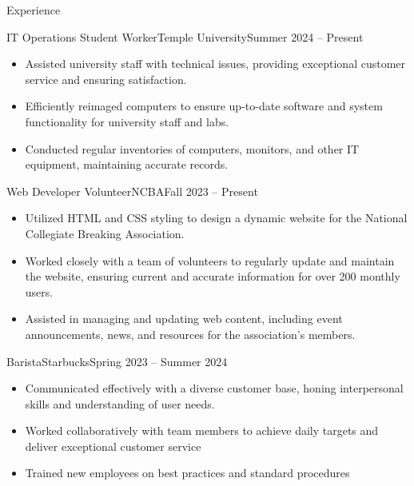 \documentclass[]{mcdowellcv}
\begin{document}
	\begin{cvsection}{Experience}
		\begin{cvsubsection}{IT Operations Student Worker}{Temple University}{Summer 2024 -- Present}			
			\begin{itemize}
				\item Assisted university staff with technical issues, providing exceptional customer service and ensuring satisfaction.
				\item Efficiently reimaged computers to ensure up-to-date software and system functionality for university staff and labs.
				\item Conducted regular inventories of computers, monitors, and other IT equipment, maintaining accurate records.
			\end{itemize}
		\end{cvsubsection}
		
		\begin{cvsubsection}{Web Developer Volunteer}{NCBA}{Fall 2023 -- Present}	
			\begin{itemize}
				\item Utilized HTML and CSS styling to design a dynamic website for the National Collegiate Breaking Association.
				\item Worked closely with a team of volunteers to regularly update and maintain the website, ensuring current and accurate information for over 200 monthly users.
				\item Assisted in managing and updating web content, including event announcements, news, and resources for the association's members.
			\end{itemize}
		\end{cvsubsection}
		
		\begin{cvsubsection}{Barista}{Starbucks}{Spring 2023 -- Summer 2024}		
			\begin{itemize}
				\item Communicated effectively with a diverse customer base, honing interpersonal skills and understanding of user needs.
				\item Worked collaboratively with team members to achieve daily targets and deliver exceptional customer service
				\item Trained new employees on best practices and standard procedures 
			\end{itemize}
		\end{cvsubsection}
	\end{cvsection}
\end{document}
